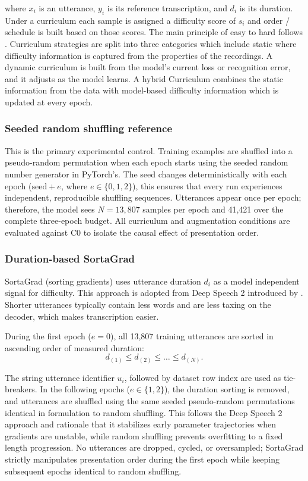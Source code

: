 {where $x_i$ is an utterance, $y_i$ is its reference transcription, and $d_i$ is its duration. Under a curriculum each sample is assigned a difficulty score of $s_i$ and order / schedule is built based on those scores. The main principle of easy to hard follows \citep{Bengio2009}. Curriculum strategies are split into three categories which include static where difficulty information is captured from the properties of the recordings. A dynamic curriculum is built from the model’s current loss or recognition error, and it adjusts as the model learns. A hybrid Curriculum combines the static information from the data with model-based difficulty information which is updated at every epoch. 

\subsubsection{Seeded random shuffling reference}

This is the primary experimental control. Training examples are
shuffled into a pseudo-random permutation when each epoch starts using the
seeded random number generator in PyTorch's. The seed changes deterministically
with each epoch ($\text{seed} + e$, where $e \in \{0, 1, 2\}$), this ensures
that every run experiences independent, reproducible shuffling sequences. Utterances 
appear once per epoch; therefore, the model sees
$N = 13{,}807$ samples per epoch and 41,421 over the
complete three-epoch budget. All curriculum and augmentation conditions are
evaluated against C0 to isolate the causal effect of presentation order.

\subsubsection{Duration-based SortaGrad}

SortaGrad (sorting gradients) uses utterance duration $d_i$ as a model independent signal for difficulty. This approach is adopted from Deep Speech 2 introduced by \citep{Amodei2015}. Shorter utterances typically contain less words and are less taxing on the decoder, which makes transcription easier.

During the first epoch ($e=0$), all 13,807 training utterances are sorted
in ascending order of measured duration:
\begin{equation}
    d_{(1)} \le d_{(2)} \le \dots \le d_{(N)}.
\end{equation}

The string utterance identifier $u_i$, followed by dataset row index are used 
as tie-breakers. In the following epochs ($e \in \{1, 2\}$), the duration sorting
is removed, and utterances are shuffled using the same seeded pseudo-random
permutations identical in formulation to random shuffling. This follows the Deep 
Speech 2 approach and rationale that it stabilizes early parameter trajectories when gradients 
are unstable, while random shuffling prevents overfitting to a fixed length progression.
No utterances are dropped, cycled, or oversampled; SortaGrad strictly manipulates
presentation order during the first epoch while keeping subsequent epochs
identical to random shuffling.

}
